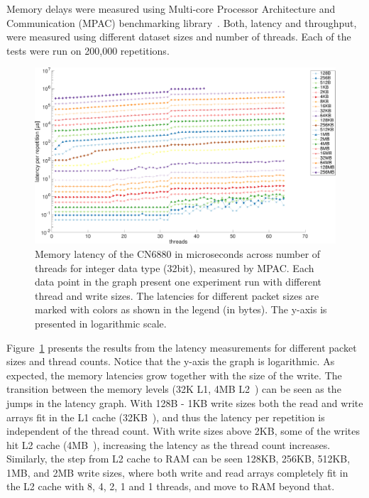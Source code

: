 Memory delays were measured using Multi-core Processor Architecture and Communication (MPAC) benchmarking library~\cite{Jamal:2009:MPAC}. Both, latency and throughput, were measured using different dataset sizes and number of threads. Each of the tests were run on 200,000 repetitions.

\begin{figure}[]
  \begin{center}
    \includegraphics[width=\textwidth]{images/mem-latency.pdf}
    \caption{Memory latency of the CN6880 in microseconds across number of threads for integer data type (32bit), measured by MPAC. Each data point in the graph present one experiment run with different thread and write sizes. The latencies for different packet sizes are marked with colors as shown in the legend (in bytes). The y-axis is presented in logarithmic scale.}
    \label{fig:mem-latency}
  \end{center}
\end{figure}

Figure~\ref{fig:mem-latency} presents the results from the latency measurements for different packet sizes and thread counts. Notice that the y-axis the graph is logarithmic. As expected, the memory latencies grow together with the size of the write. The transition between the memory levels (32K L1, 4MB L2~\cite{cavium:2010:fundamentals}) can be seen as the jumps in the latency graph. With 128B - 1KB write sizes both the read and write arrays fit in the L1 cache (32KB~\cite{cavium:2010:fundamentals}), and thus the latency per repetition is independent of the thread count. With write sizes above 2KB, some of the writes hit L2 cache (4MB~\cite{cavium:2010:fundamentals}), increasing the latency as the thread count increases. Similarly, the step from L2 cache to RAM can be seen 128KB, 256KB, 512KB, 1MB, and 2MB write sizes, where both write and read arrays completely fit in the L2 cache with 8, 4, 2, 1 and 1 threads, and move to RAM beyond that.

